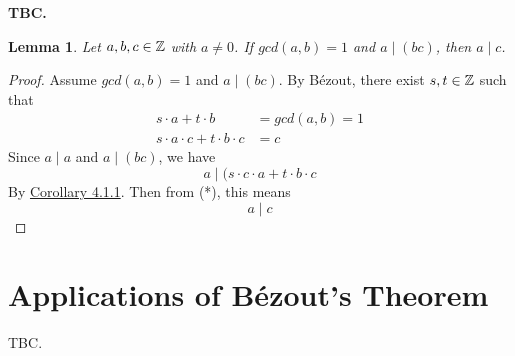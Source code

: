 \documentclass[openany]{report}
\newtheorem{lemma}{Lemma}[section]
\begin{document}
\textbf{TBC.}
\begin{lemma}\label{lemma6.0.2}
    Let $a,b,c \in \mathbb{Z}$ with $a \neq 0$. If $gcd(a,b) = 1$ and $a \mid (bc)$, then $a \mid c$.
\end{lemma}
\begin{proof}
    Assume $gcd(a,b) = 1$ and $a \mid (bc)$. By B\'ezout, there exist $s,t \in \mathbb{Z}$ such that 
    \begin{align*}
        s \cdot a + t \cdot b &= gcd(a,b) = 1\\
        s \cdot a \cdot c + t \cdot b \cdot c &= c\tag{*}
    \end{align*}
    Since $a \mid a$ and $a \mid (bc)$, we have 
    $$a \mid (s \cdot c \cdot a + t \cdot b \cdot c$$
    By \hyperref[corollary4.1.1]{Corollary 4.1.1}. Then from (*), this means 
    $$a \mid c$$
\end{proof}
\chapter{Applications of B\'ezout's Theorem}
TBC. 
\end{document}
